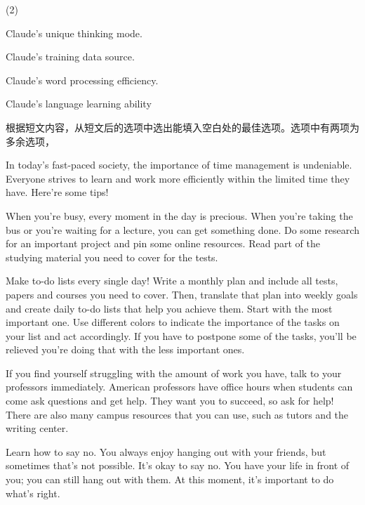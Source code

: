 \documentclass{英语试卷}
\begin{document}
\begin{choices}(2)
  \item Claude's unique thinking mode.
  \item Claude's training data source.
  \item Claude's word processing efficiency.
  \item Claude's language learning ability
\end{choices}
\par 根据短文内容，从短文后的选项中选出能填入空白处的最佳选项。选项中有两项为多余选项，\par
\par In today's fast-paced society, the importance of time management is undeniable. Everyone strives to learn and work more efficiently within the limited time they have.  Here're some tips!\par
\par When you're busy, every moment in the day is precious.  When you're taking the bus or you're waiting for a lecture, you can get something done. Do some research for an important project and pin some online resources. Read part of the studying material you need to cover for the tests.\par
\par Make to-do lists every single day! Write a monthly plan and include all tests, papers and courses you need to cover. Then, translate that plan into weekly goals and create daily to-do lists that help you achieve them.  Start with the most important one. Use different colors to indicate the importance of the tasks on your list and act accordingly. If you have to postpone some of the tasks, you'll be relieved you're doing that with the less important ones.\par
\par If you find yourself struggling with the amount of work you have, talk to your professors immediately. American professors have office hours when students can come ask questions and get help. They want you to succeed, so ask for help! There are also many campus resources that you can use, such as tutors and the writing center. \par
\par Learn how to say no. You always enjoy hanging out with your friends, but sometimes that's not possible.  It's okay to say no. You have your life in front of you; you can still hang out with them. At this moment, it's important to do what's right.\par
\end{document}
